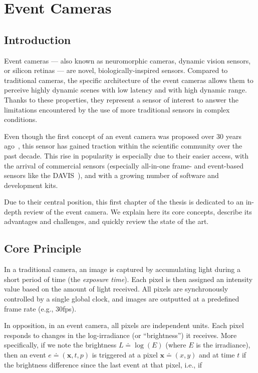 \chapter{Event Cameras}\label{sec:evtcams}

\section{Introduction}
Event cameras --- also known as neuromorphic cameras, dynamic vision sensors, or silicon retinas --- are novel, biologically-inspired sensors. Compared to traditional cameras, the specific architecture of the event cameras allows them to perceive highly dynamic scenes with low latency and with high dynamic range. Thanks to these properties, they represent a sensor of interest to answer the limitations encountered by the use of more traditional sensors in complex conditions.

Even though the first concept of an event camera was proposed over 30 years ago~\cite{Mahowald1991TheSR,Mahowald1992VLSIAO}, this sensor has gained traction within the scientific community over the past decade. This rise in popularity is especially due to their easier access, with the arrival of commercial sensors (especially all-in-one frame- and event-based sensors like the DAVIS~\cite{Brandli2014A2}), and with a growing number of software and development kits.

Due to their central position, this first chapter of the thesis is dedicated to an in-depth review of the event camera. We explain here its core concepts, describe its advantages and challenges, and quickly review the state of the art.

\section{Core Principle}
In a traditional camera, an image is captured by accumulating light during a short period of time (the \textit{exposure time}). Each pixel is then assigned an intensity value based on the amount of light received. All pixels are synchronously controlled by a single global clock, and images are outputted at a predefined frame rate (e.g., 30\acrshort{fps}).

In opposition, in an event camera, all pixels are independent units. Each pixel responds to changes in the log-irradiance (or ``brightness'') it receives. More specifically, if we note the brightness \(L \doteq \log(E)\) (where \(E\) is the irradiance), then an event \(e \doteq (\mathbf{x}, t, p)\) is triggered at a pixel \(\mathbf{x} \doteq (x, y)\) and at time \(t\) if the brightness difference since the last event at that pixel, i.e., if

